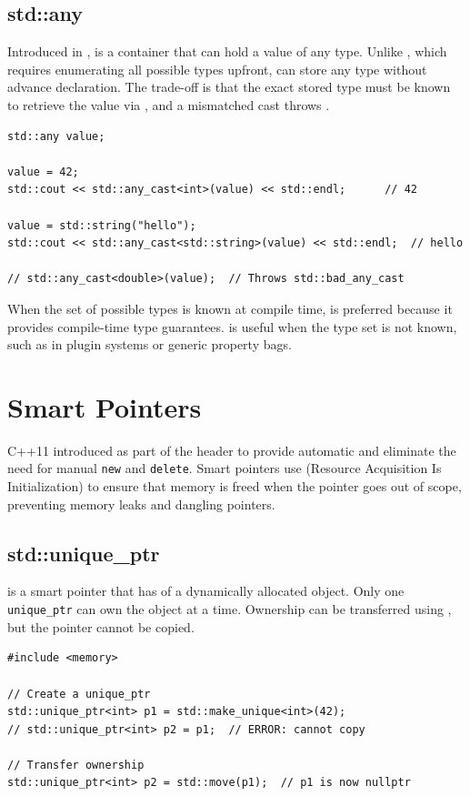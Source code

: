 \subsection{std::any}
Introduced in ,  is a container that can hold a value of any type. Unlike , which requires enumerating all possible types upfront,  can store any type without advance declaration. The trade-off is that the exact stored type must be known to retrieve the value via , and a mismatched cast throws .
\begin{lstlisting}
std::any value;

value = 42;
std::cout << std::any_cast<int>(value) << std::endl;      // 42

value = std::string("hello");
std::cout << std::any_cast<std::string>(value) << std::endl;  // hello

// std::any_cast<double>(value);  // Throws std::bad_any_cast
\end{lstlisting}
When the set of possible types is known at compile time,  is preferred because it provides compile-time type guarantees.  is useful when the type set is not known, such as in plugin systems or generic property bags.

\section{Smart Pointers}
C++11 introduced  as part of the  header to provide automatic  and eliminate the need for manual \texttt{new} and \texttt{delete}. Smart pointers use  (Resource Acquisition Is Initialization) to ensure that memory is freed when the pointer goes out of scope, preventing memory leaks and dangling pointers.

\subsection{std::unique\_ptr}
 is a smart pointer that has  of a dynamically allocated object. Only one \texttt{unique\_ptr} can own the object at a time. Ownership can be transferred using , but the pointer cannot be copied.
\begin{lstlisting}
#include <memory>

// Create a unique_ptr
std::unique_ptr<int> p1 = std::make_unique<int>(42);
// std::unique_ptr<int> p2 = p1;  // ERROR: cannot copy

// Transfer ownership
std::unique_ptr<int> p2 = std::move(p1);  // p1 is now nullptr
\end{lstlisting}

